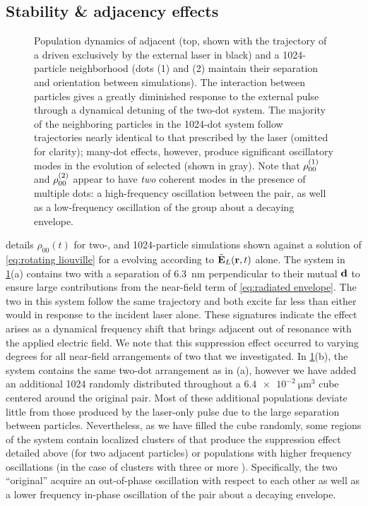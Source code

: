 \subsection{Stability \& adjacency effects}

\begin{figure}
  \centering
  
  \caption{\label{fig:density stats}Population dynamics of adjacent \qds{} (top, shown with the trajectory of a \qd{} driven exclusively by the external laser in black) and a 1024-particle neighborhood (dots (1) and (2) maintain their separation and orientation between simulations).
    The interaction between particles gives a greatly diminished response to the external pulse through a dynamical detuning of the two-dot system.
    The majority of the neighboring particles in the 1024-dot system follow trajectories nearly identical to that prescribed by the laser (omitted for clarity); many-dot effects, however, produce significant oscillatory modes in the evolution of selected \qds{} (shown in gray).
    Note that $\rho_{00}^{\qty(1)}$ and $\rho_{00}^{\qty(2)}$ appear to have \emph{two} coherent modes in the presence of multiple dots: a high-frequency oscillation between the pair, as well as a low-frequency oscillation of the group about a decaying envelope.
}
\end{figure}

 details $\rho_{00}(t)$ for two-, and 1024-particle simulations shown against a solution of \cref{eq:rotating liouville} for a \qd{} evolving according to $\tilde{\vb{E}}_L(\vb{r}, t)$ alone.
The system in \cref{fig:density stats}(a) contains two \qds{} with a separation of \SI{6.3}{\nano\meter} perpendicular to their mutual $\vb{d}$ to ensure large contributions from the near-field term of \cref{eq:radiated envelope}.
The two \qds{} in this system follow the same trajectory and both excite far less than either would in response to the incident laser alone.
These signatures indicate the effect arises as a dynamical frequency shift that brings adjacent \qds{} out of resonance with the applied electric field.
We note that this suppression effect occurred to varying degrees for all near-field arrangements of two \qds{} that we investigated.
In \cref{fig:density stats}(b), the system contains the same two-dot arrangement as in (a), however we have added an additional 1024 \qds{} randomly distributed throughout a $\SI{6.4e-2}{\micro\meter\cubed}$ cube centered around the original pair.
Most of these additional \qd{} populations deviate little from those produced by the laser-only pulse due to the large separation between particles.
Nevertheless, as we have filled the cube randomly, some regions of the system contain localized clusters of \qds{} that produce the suppression effect detailed above (for two adjacent particles) or populations with higher frequency oscillations (in the case of clusters with three or more \qds{}).
Specifically, the two ``original'' \qds{} acquire an out-of-phase oscillation with respect to each other as well as a lower frequency in-phase oscillation of the pair about a decaying envelope.


